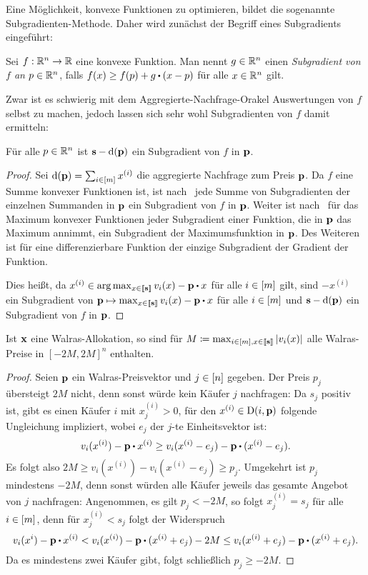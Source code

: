 Eine Möglichkeit, konvexe Funktionen zu optimieren, bildet die sogenannte Subgradienten-Methode.
Daher wird zunächst der Begriff eines Subgradients eingeführt:
\begin{definition}[Subgradient]
	Sei $f:\mathbb{R}^n \rightarrow \mathbb{R}$ eine konvexe Funktion.
	Man nennt $g\in\mathbb{R}^n$ einen \emph{Subgradient von $f$ an $p\in\mathbb{R}^n$}, falls $f(x) \geq f(p) + g\bcdot (x - p)$ für alle $x\in\mathbb{R}^n$ gilt.
\end{definition}

Zwar ist es schwierig mit dem Aggregierte-Nachfrage-Orakel Auswertungen von $f$ selbst zu machen, jedoch lassen sich sehr wohl Subgradienten von $f$ damit ermitteln:
\begin{lemma}
	Für alle $p\in\mathbb{R}^n$ ist $\mathbf{s} - \operatorname{d}(\mathbf{p})$ ein Subgradient von $f$ in $\mathbf{p}$.
\end{lemma}
\begin{proof}
	Sei $\operatorname{d}(\mathbf{p}) = \sum_{i\in\left[ m \right]} x^{(i)}$ die aggregierte Nachfrage zum Preis $\mathbf{p}$.
	Da $f$ eine Summe konvexer Funktionen ist, ist nach~\cite[Theorem~1.12]{Shor1985} jede Summe von Subgradienten der einzelnen Summanden in $\mathbf{p}$ ein Subgradient von $f$ in $\mathbf{p}$.
	Weiter ist nach~\cite[Theorem~1.13]{Shor1985} für das Maximum konvexer Funktionen jeder Subgradient einer Funktion, die in $\mathbf{p}$ das Maximum annimmt, ein Subgradient der Maximumsfunktion in $\mathbf{p}$.
	Des Weiteren ist für eine differenzierbare Funktion der einzige Subgradient der Gradient der Funktion.
	
	Dies heißt, da $x^{(i)}\in \arg\max_{x\in\ffirst{\fs}} v_i(x) - \fp \bcdot x$ für alle $i\in\left[ m \right]$ gilt, sind $-x^{(i)}$ ein Subgradient von $\fp \mapsto \max_{x\in\ffirst{\fs}} v_i(x) - \fp \bcdot x$ für alle $i\in\left[ m \right]$ und $\mathbf{s} - \operatorname{d}(\mathbf{p})$ ein Subgradient von $f$ in $\mathbf{p}$.
\end{proof}

\begin{lemma}\label{prices-bounded}
	Ist $\mathbf{x}$ eine Walras-Allokation, so sind für $M\coloneqq \max_{i\in\left[ m \right], x\in\left\llbracket \mathbf{s} \right\rrbracket} \left\lvert v_i(x) \right\rvert$ alle Walras-Preise in $[-2M, 2M]^n$ enthalten.
\end{lemma}
\begin{proof}
	Seien $\mathbf{p}$ ein Walras-Preisvektor und $j\in\left[ n \right]$ gegeben.
	Der Preis $p_j$ übersteigt $2M$ nicht, denn sonst würde kein Käufer $j$ nachfragen:
	Da $s_j$ positiv ist, gibt es einen Käufer $i$ mit $x^{(i)}_j > 0$, für den $x^{(i)} \in\operatorname{D}(i, \mathbf{p})$ folgende Ungleichung impliziert, wobei $e_j$ der $j$-te Einheitsvektor ist:
	\[
	v_i(x^{(i)}) - \fp \bcdot x^{(i)} \geq v_i(x^{(i)} - e_j) - \fp \bcdot ( x^{(i)} - e_j ).
	 \]
	 Es folgt also $2M \geq v_i(x^{(i)}) - v_i(x^{(i)} - e_j) \geq p_j$.
	 Umgekehrt ist $p_j$ mindestens $-2M$, denn sonst würden alle Käufer jeweils das gesamte Angebot von $j$ nachfragen:
	 Angenommen, es gilt $p_j < -2M$, so folgt $x^{(i)}_j = s_j$ für alle $i\in\left[ m \right]$, denn für $x^{(i)}_j < s_j$ folgt der Widerspruch
	 \[ 
	 	v_i(x^{i})  - \fp \bcdot x^{(i)} < v_i(x^{(i)}) - \fp \bcdot (x^{(i)} + e_j) - 2M \leq v_i(x^{(i)} + e_j) - \fp \bcdot (x^{(i)} + e_j).
	 \]
	 Da es mindestens zwei Käufer gibt, folgt schließlich $p_j \geq -2M$.
\end{proof}

